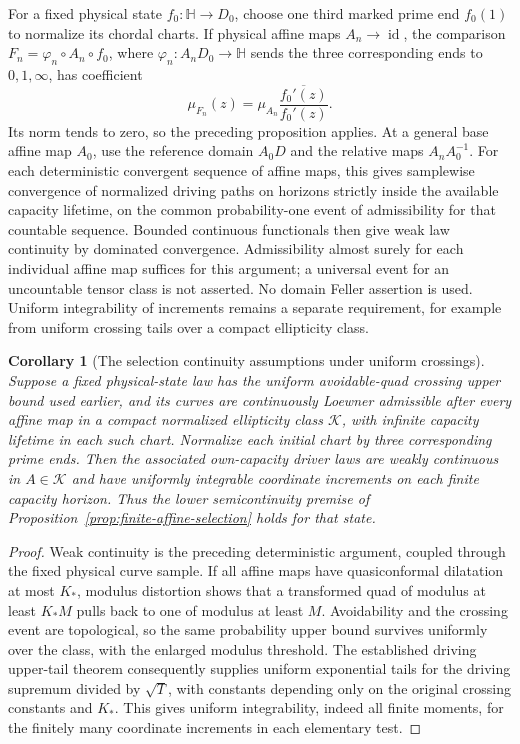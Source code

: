\documentclass[11pt]{article}
\newtheorem{corollary}[theorem]{Corollary}
\theoremstyle{definition}\newtheorem{definition}[theorem]{Definition}
\theoremstyle{remark}\newtheorem{remark}[theorem]{Remark}
\begin{document}
For a fixed physical state $f_0:\mathbb H\to D_0$, choose one
third marked prime end $f_0(1)$ to normalize its chordal charts.
If physical affine maps $A_n\to\operatorname{id}$, the comparison
$F_n=\varphi_n\circ A_n\circ f_0$, where
$\varphi_n:A_nD_0\to\mathbb H$ sends the three corresponding
ends to $0,1,\infty$, has coefficient
\[
 \mu_{F_n}(z)=\mu_{A_n}
             \frac{\overline{f_0'(z)}}{f_0'(z)}.
 \tag{FS8}
\]
Its norm tends to zero, so the preceding proposition applies.
At a general base affine map $A_0$, use the reference domain
$A_0D$ and the relative maps $A_nA_0^{-1}$. For each deterministic
convergent sequence of affine maps, this gives samplewise convergence
of normalized driving paths on horizons strictly inside the available
capacity lifetime, on the common probability-one event of admissibility
for that countable sequence. Bounded continuous functionals then give
weak law continuity by dominated convergence. Admissibility almost
surely for each individual affine map suffices for this argument;
a universal event for an uncountable tensor class is not asserted.
No domain Feller assertion is used. Uniform integrability
of increments remains a separate requirement, for example from
uniform crossing tails over a compact ellipticity class.

\begin{corollary}[The selection continuity assumptions under uniform crossings]
\label{cor:affine-selection-continuity-crossings}
Suppose a fixed physical-state law has the uniform avoidable-quad
crossing upper bound used earlier, and its curves are continuously
Loewner admissible after every affine map in a compact normalized
ellipticity class $\mathcal K$, with infinite capacity lifetime in each such chart.
Normalize each initial chart by three
corresponding prime ends. Then the associated own-capacity driver
laws are weakly continuous in $A\in\mathcal K$ and have uniformly
integrable coordinate increments on each finite capacity horizon.
Thus the lower semicontinuity premise of
Proposition~\ref{prop:finite-affine-selection} holds for that state.
\end{corollary}
\begin{proof}
Weak continuity is the preceding deterministic argument, coupled
through the fixed physical curve sample. If all affine maps have
quasiconformal dilatation at most $K_*$, modulus distortion shows
that a transformed quad of modulus at least $K_*M$ pulls back to
one of modulus at least $M$. Avoidability and the crossing event
are topological, so the same probability upper bound survives
uniformly over the class, with the enlarged modulus threshold.
The established driving upper-tail theorem consequently supplies
uniform exponential tails for the driving supremum divided by
$\sqrt T$, with constants depending only on the original crossing
constants and $K_*$. This gives uniform integrability, indeed all
finite moments, for the finitely many coordinate increments in
each elementary test.
\end{proof}
\end{document}
